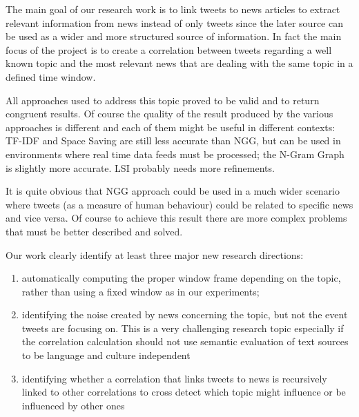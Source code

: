 The main goal of our research work is to link tweets to news articles to extract relevant information from news 
instead of only tweets since the later source can be used as a wider and more structured source of information. 
In fact the main focus of the project is to create a correlation between tweets
regarding a well known topic and 
the most relevant news that are dealing with the same topic in a defined time window.
 
All approaches used to address this topic proved to be valid and to return congruent results. 
Of course the quality of the result produced by the various approaches is different and each of them
might be useful in different contexts: TF-IDF and Space Saving are still less
accurate than NGG, but can be used in environments where 
real time data feeds must be processed; the N-Gram Graph is slightly
more accurate. LSI probably needs more refinements.


It is quite obvious that NGG approach could be used in a much wider scenario where tweets (as a measure of 
human behaviour) could be related to specific news and vice versa. Of course to achieve this result there 
are more complex problems that must be better described and solved.

Our work clearly identify at least three major new research directions:
\begin{enumerate}
	\item automatically computing the proper window frame depending on the topic,
		rather than using a fixed window as in our experiments;
	\item identifying the noise created by news concerning the topic, but not the
		event tweets are focusing on. This is a very challenging research topic especially if the correlation calculation should not use semantic evaluation of text sources to be language and culture  independent 
	\item identifying whether a correlation that links tweets to news is recursively linked to other correlations to cross detect which topic might influence or be influenced by other ones
\end{enumerate}

%

